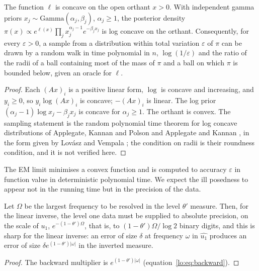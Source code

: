 \begin{theorem}\label{cx:thm:logconcave}
The function $\ell$ is concave on the open orthant $x>0$. With independent gamma priors $x_j\sim\mathrm{Gamma}(\alpha_j,\beta_j)$, $\alpha_j\ge1$, the posterior density $\pi(x)\propto e^{\ell(x)}\prod_jx_j^{\alpha_j-1}e^{-\beta_jx_j}$ is log concave on the orthant. Consequently, for every $\varepsilon>0$, a sample from a distribution within total variation $\varepsilon$ of $\pi$ can be drawn by a random walk in time polynomial in $n$, $\log(1/\varepsilon)$ and the ratio of the radii of a ball containing most of the mass of $\pi$ and a ball on which $\pi$ is bounded below, given an oracle for $\ell$.
\end{theorem}

\begin{proof}
Each $(Ax)_i$ is a positive linear form, $\log$ is concave and increasing, and $y_i\ge0$, so $y_i\log(Ax)_i$ is concave; $-(Ax)_i$ is linear. The log prior $(\alpha_j-1)\log x_j-\beta_jx_j$ is concave for $\alpha_j\ge1$. The orthant is convex. The sampling statement is the random polynomial time theorem for log concave distributions of Applegate, Kannan and Polson \cite{AKP90} and Applegate and Kannan \cite{AK91}, in the form given by Lov\'asz and Vempala \cite{LV07}; the condition on radii is their roundness condition, and it is not verified here.
\end{proof}

The EM limit minimises a convex function and is computed to accuracy $\varepsilon$ in function value in deterministic polynomial time. We expect the ill posedness to appear not in the running time but in the precision of the data.

\begin{proposition}[precision]\label{cx:prop:precision}
Let $\Omega$ be the largest frequency to be resolved in the level $\theta'$ measure. Then, for the linear inverse, the level one data must be supplied to absolute precision, on the scale of $u_1$, $e^{-(1-\theta')\Omega}$, that is, to $(1-\theta')\Omega/\log2$ binary digits, and this is sharp for the linear inverse: an error of size $\delta$ at frequency $\omega$ in $\widehat{u_1}$ produces an error of size $\delta e^{(1-\theta')|\omega|}$ in the inverted measure.
\end{proposition}

\begin{proof}
The backward multiplier is $e^{(1-\theta')|\omega|}$ (equation~\eqref{lo:eq:backward}).
\end{proof}

